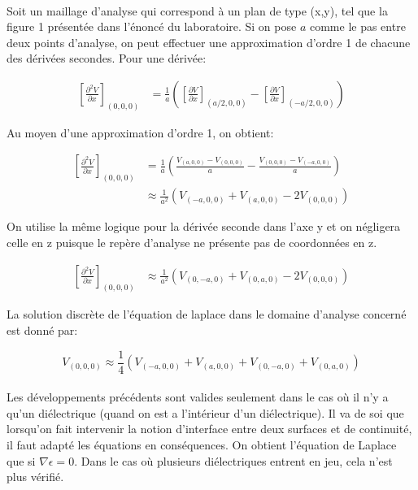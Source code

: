 \paragraph{} Soit un maillage d'analyse qui correspond à un plan de type (x,y), tel que la figure 1 présentée dans l'énoncé du laboratoire. Si on pose $a$ comme le pas entre deux points d'analyse, on peut effectuer une approximation d'ordre 1 de chacune des dérivées secondes. Pour une dérivée:

\begin{align}
\left[ \frac{\partial^2 V}{\partial x}\right]_{(0,0,0)} &= \frac{1}{a}\left( \left[ \frac{\partial V}{\partial x}\right]_{(a/2,0,0)} - \left[ \frac{\partial V}{\partial x}\right]_{(-a/2,0,0)} \right)
\end{align}

Au moyen d'une approximation d'ordre 1, on obtient:

\begin{align}
\left[ \frac{\partial^2 V}{\partial x}\right]_{(0,0,0)} &= \frac{1}{a}\left( \frac{V_{(a,0,0)} - V_{(0,0,0)}}{a} - \frac{V_{(0,0,0)} - V_{(-a,0,0)}}{a} \right)\\
&\approx \frac{1}{a^2} \left( V_{(-a,0,0)} + V_{(a,0,0)} - 2 V_{(0,0,0)} \right)
\end{align}

On utilise la même logique pour la dérivée seconde dans l'axe y et on négligera celle en z puisque le repère d'analyse ne présente pas de coordonnées en z.
 
\begin{align}
\left[ \frac{\partial^2 V}{\partial x}\right]_{(0,0,0)} &\approx \frac{1}{a^2} \left( V_{(0,-a,0)} + V_{(0,a,0)} - 2 V_{(0,0,0)} \right)
\end{align}

La solution discrète de l'équation de laplace dans le domaine d'analyse concerné est donné par:

\begin{equation}
V_{(0,0,0)} \approx \frac{1}{4} \left(V_{(-a,0,0)} + V_{(a,0,0)} + V_{(0,-a,0)} + V_{(0,a,0)} \right)
\end{equation}

\paragraph{}Les développements précédents sont valides seulement dans le cas où il n'y a qu'un diélectrique (quand on est a l'intérieur d'un diélectrique). Il va de soi que lorsqu'on fait intervenir la notion d'interface entre deux surfaces et de continuité, il faut adapté les équations en conséquences. On obtient l'équation de Laplace que si $\nabla \epsilon = 0$. Dans le cas où plusieurs diélectriques entrent en jeu, cela n'est plus vérifié.  

